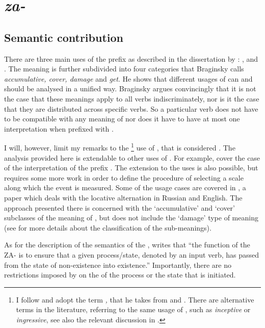 \section{\textit{za-}}\label{subsection:semantics:za}
\subsection{Semantic contribution}
There are three main uses of the prefix  as described in the dissertation by \citet{Braginsky:08}: ,  and . The  meaning is further subdivided into four categories that Braginsky calls \textit{accumulative, cover, damage} and \textit{get}. He shows that different usages of  can and should be analysed in a unified way. Braginsky argues convincingly that it is not the case that these meanings apply to all verbs indiscriminately, nor is it the case that they are distributed across specific verbs. So a particular verb does not have to be compatible with any meaning of  nor does it have to have at most one interpretation when prefixed with .

I will, however, limit my remarks to the \footnote{I follow \citet{Braginsky:08} and adopt the term \textit{,} that he takes from \citet{Zemskaja:55} and \citet{Zaliznjak:95}. There are alternative terms in the literature, referring to the same usage of , such as \textit{inceptive} or \textit{ingressive}, see also the relevant discussion in \citealt{Maslov:65}.} use of , that is considered . The analysis provided here is extendable to other uses of . For example, \cite{ZinovaOsswald:paper} cover the case of the  interpretation of the prefix . The extension to the  uses is also possible, but requires some more work in order to define the procedure of selecting a scale along which the event is measured. Some of the  usage cases are covered in \citet{Zinova:14}, a paper which deals with the locative alternation in Russian and English. The approach presented there is concerned with the `accumulative' and `cover' subclasses of the  meaning of , but does not include the `damage' type of meaning (see \citealt{Braginsky:08} for more details about the classification of the  sub-meanings).

As for the description of the semantics of the  , \citet{Braginsky:08} writes \citep[following][]{Sheljakin:69} that ``the function of the  ZA- is to ensure that a given process\slash state, denoted by an input verb, has passed from the state of non-existence into existence.'' Importantly, there are no restrictions imposed by  on the  of the process or the state that is initiated.

